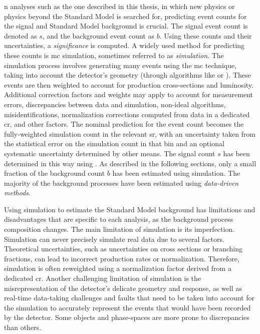 n analyses such as the one described in this thesis, in which new physics or physics beyond the Standard Model is searched for, predicting event counts for the signal and Standard Model background is crucial. The signal event count is denoted as $s$, and the background event count as $b$. Using these counts and their uncertainties, a \emph{significance} is computed. A widely used method for predicting these counts is \gls{mc} simulation, sometimes referred to as \emph{simulation}. The simulation process involves generating many events using the \gls{mc} technique, taking into account the detector's geometry (through algorithms like \FASTSIM or \FULLSIM). These events are then weighted to account for production cross-sections and luminosity. Additional correction factors and weights may apply to account for measurement errors, discrepancies between data and simulation, non-ideal algorithms, misidentifications, normalization corrections computed from data in a dedicated \gls{cr}, and other factors. The nominal prediction for the event count becomes the fully-weighted simulation count in the relevant \gls{sr}, with an uncertainty taken from the statistical error on the simulation count in that bin and an optional systematic uncertainty determined by other means. The signal count $s$ has been determined in this way using \FASTSIM. As described in the following sections, only a small fraction of the background count $b$ has been estimated using simulation. The majority of the background processes have been estimated using \emph{data-driven methods}.

Using simulation to estimate the Standard Model background has limitations and disadvantages that are specific to each analysis, as the background process composition changes. The main limitation of simulation is its imperfection. Simulation can never precisely simulate real data due to several factors. Theoretical uncertainties, such as uncertainties on cross sections or branching fractions, can lead to incorrect production rates or normalization. Therefore, simulation is often reweighted using a normalization factor derived from a dedicated \gls{cr}. Another challenging limitation of simulation is the misrepresentation of the detector's delicate geometry and response, as well as real-time data-taking challenges and faults that need to be taken into account for the simulation to accurately represent the events that would have been recorded by the detector. Some objects and phase-spaces are more prone to discrepancies than others.

